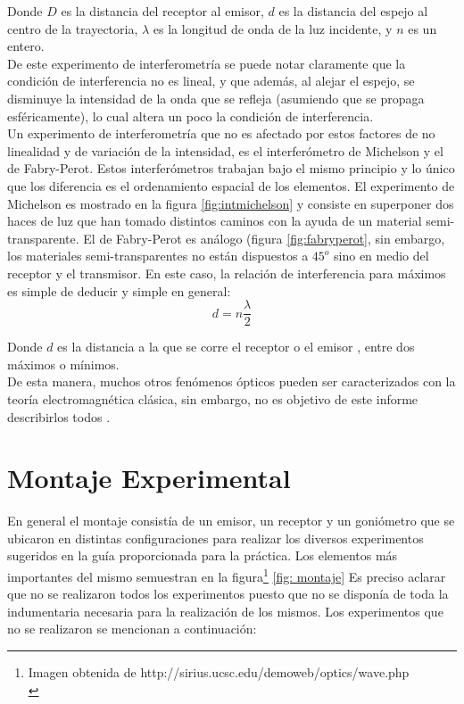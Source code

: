 \documentclass[prb,aps,twocolumn,preprintnumbers,amsmath,amssymb]{revtex4}
\begin{document}
Donde $D$ es la distancia del receptor al emisor, $d$ es la distancia del espejo al centro de la trayectoria, $\lambda$ es la longitud de onda de la luz incidente, y $n$ es un entero.\\

De este experimento de interferometría se puede notar claramente que la condición de interferencia no es lineal, y que además, al alejar el espejo, se disminuye la intensidad de la onda que se refleja (asumiendo que se propaga esféricamente), lo cual altera un poco la condición de interferencia.\\

Un experimento de interferometría que no es afectado por estos factores de no linealidad y de variación de la intensidad, es el interferómetro de Michelson y el de Fabry-Perot. Estos interferómetros trabajan bajo el mismo principio y lo único que los diferencia es el ordenamiento espacial de los elementos. El experimento de Michelson es mostrado en la figura \ref{fig:intmichelson} y consiste en superponer dos haces de luz que han tomado distintos caminos con la ayuda de un material semi-transparente. El de Fabry-Perot es análogo (figura \ref{fig:fabryperot}, sin embargo, los materiales semi-transparentes no están dispuestos a $45^o$ sino en medio del receptor y el transmisor.  En este caso, la relación de interferencia para máximos es simple de deducir y simple en general:\\

\begin{equation}
d = n\frac{\lambda}{2}
\label{eq:Michelson}
\end{equation}

Donde $d$ es la distancia a la que se corre el receptor o el emisor , entre dos máximos o mínimos. \\

De esta manera, muchos otros fenómenos ópticos pueden ser caracterizados con la teoría electromagnética clásica, sin embargo, no es objetivo de este informe describirlos todos .\\ 

\section{Montaje Experimental}

En general el montaje consistía de un emisor, un receptor y un goniómetro que se ubicaron en distintas configuraciones para realizar los diversos experimentos sugeridos en la guía proporcionada para la práctica. Los elementos más importantes del mismo semuestran en la figura\footnote{Imagen obtenida de http://sirius.ucsc.edu/demoweb/optics/wave.php \\} \ref{fig: montaje} Es preciso aclarar que no se realizaron todos los experimentos puesto que no se disponía de toda la indumentaria necesaria para la realización de los mismos. Los experimentos que no se realizaron se mencionan a continuación:
\end{document}
